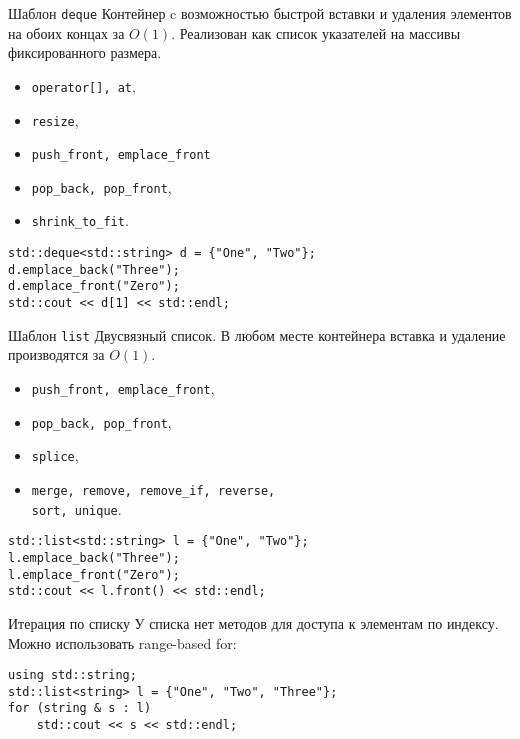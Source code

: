 \documentclass{beamer}
\begin{document}
\begin{frame}[fragile]{Шаблон {\tt deque}}
Контейнер c возможностью быстрой вставки и удаления элементов на
обоих концах за $O(1)$. Реализован как список указателей на массивы
фиксированного размера.
\begin{itemize}
    \item {\tt operator[], at},
    \item {\tt resize},
    \item {\tt push\_front, emplace\_front}
    \item \texttt{pop\_back, pop\_front},
    \item \texttt{shrink\_to\_fit}.
\end{itemize}
\begin{lstlisting}
std::deque<std::string> d = {"One", "Two"};
d.emplace_back("Three");
d.emplace_front("Zero");
std::cout << d[1] << std::endl;
\end{lstlisting}

\end{frame}

\begin{frame}[fragile]{Шаблон {\tt list}}
Двусвязный список. В любом месте контейнера 
вставка и удаление производятся за $O(1)$.
\begin{itemize}
    \item {\tt push\_front, emplace\_front},
    \item \texttt{pop\_back, pop\_front},
    \item \texttt{splice},
    \item {\tt merge, remove, remove\_if, reverse, \\sort, unique}.
\end{itemize}
\begin{lstlisting}
std::list<std::string> l = {"One", "Two"};
l.emplace_back("Three");
l.emplace_front("Zero");
std::cout << l.front() << std::endl;
\end{lstlisting}
\end{frame}

\begin{frame}[fragile]{Итерация по списку}
У списка нет методов для доступа к элементам по индексу.\\
Можно использовать range-based for:
\begin{lstlisting}
using std::string;
std::list<string> l = {"One", "Two", "Three"};
for (string & s : l)
    std::cout << s << std::endl;
\end{lstlisting}
\end{frame}
\end{document}
